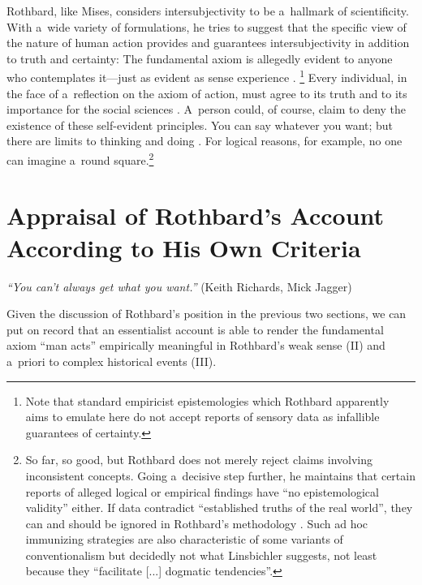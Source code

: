 Rothbard, like Mises, considers intersubjectivity to be a~hallmark of scientificity. With a~wide variety of formulations, he tries to suggest that the specific view of the nature of human action provides and guarantees intersubjectivity in addition to truth and certainty: The fundamental axiom is allegedly evident to anyone who contemplates it---just as evident as sense experience 
\parencite[][p.35]{rothbard_praxeology_2011}.%
\footnote{Note that standard empiricist epistemologies which Rothbard apparently aims to emulate here do not accept reports of sensory data as infallible guarantees of certainty.} Every individual, in the face of a~reflection on the axiom of action, must agree to its truth and to its importance for the social sciences 
\parencite[][p.943]{rothbard_praxeology_1951}. %
 A~person could, of course, claim to deny the existence of these self-evident principles. You can say whatever you want; but there are limits to thinking and doing 
\parencite[][p.28]{rothbard_praxeology:_1976}. %
 For logical reasons, for example, no one can imagine a~round square.\footnote{So far, so good, but Rothbard does not merely reject claims involving inconsistent concepts. Going a~decisive step further, he maintains that certain reports of alleged logical or empirical findings have ``no epistemological validity'' either. If data contradict ``established truths of the real world'', they can and should be ignored in Rothbard's methodology 
\parencite*[][p.28]{}. %
 Such ad hoc immunizing strategies are also characteristic of some variants of conventionalism but decidedly not what Linsbichler 
\parencite*[][p.3370]{linsbichler_austrian_2021} %
 suggests, not least because they ``facilitate [...] dogmatic tendencies''.}



\section{Appraisal of Rothbard's Account According to His Own Criteria}

\textit{``You can't always get what you want.''} (Keith Richards, Mick Jagger)





Given the discussion of Rothbard's position in the previous two sections, we can put on record that an essentialist account is able to render the fundamental axiom ``man acts'' empirically meaningful in Rothbard's weak sense (II) and a~priori to complex historical events (III).



